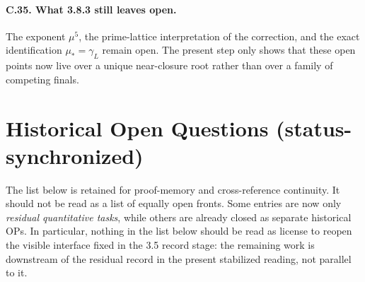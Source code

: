 \documentclass[12pt,a4paper]{article}
\begin{document}
\paragraph{C.35. What 3.8.3 still leaves open.}
The exponent \(\mu^5\), the prime-lattice interpretation of the correction, and the exact identification \(\mu_\ast=\gamma_L\) remain open. The present step only shows that these open points now live over a unique near-closure root rather than over a family of competing finals.



\section*{Historical Open Questions (status-synchronized)}
The list below is retained for proof-memory and cross-reference continuity.
It should not be read as a list of equally open fronts. Some entries are now
only \emph{residual quantitative tasks}, while others are already closed as
separate historical OPs. In particular, nothing in the list below should be
read as license to reopen the visible interface fixed in the 3.5 record stage:
the remaining work is downstream of the residual record in the present stabilized reading, not parallel to it.
\end{document}
